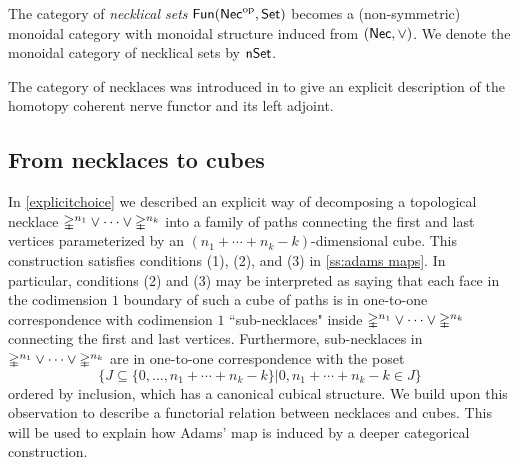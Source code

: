 The category of \textit{necklical sets} $\mathsf{Fun}(\mathsf{Nec}^{\mathrm{op}}, \mathsf{Set})$ becomes a (non-symmetric) monoidal category with monoidal structure induced from $(\mathsf{Nec}, \vee)$.
We denote the monoidal category of necklical sets by $\mathsf{nSet}$.

\begin{remark*}
	The category of necklaces was introduced in \cite{dugger2011rigidification} to give an explicit description of the homotopy coherent nerve functor and its left adjoint.
\end{remark*}

\subsection{From necklaces to cubes}

In \cref{explicitchoice} we described an explicit way of decomposing a topological necklace $\mathbb{\Delta}^{n_1} \vee \cdots \vee \mathbb{\Delta}^{n_k}$ into a family of paths connecting the first and last vertices parameterized by an $(n_1 + \cdots + n_k-k)$-dimensional cube.
This construction satisfies conditions (1), (2), and (3) in \cref{ss:adams maps}.
In particular, conditions (2) and (3) may be interpreted as saying that each face in the codimension $1$ boundary of such a cube of paths is in one-to-one correspondence with codimension $1$ ``sub-necklaces" inside $\mathbb{\Delta}^{n_1} \vee \cdots \vee \mathbb{\Delta}^{n_k}$ connecting the first and last vertices.
Furthermore, sub-necklaces in $\mathbb{\Delta}^{n_1} \vee \cdots \vee \mathbb{\Delta}^{n_k}$ are in one-to-one correspondence with the poset \[\{ J \subseteq \{0,\ldots, n_1+ \cdots + n_k-k\} | 0,n_1+ \cdots +n_k-k \in J \}\]
ordered by inclusion, which has a canonical cubical structure.
We build upon this observation to describe a functorial relation between necklaces and cubes.
This will be used to explain how Adams' map is induced by a deeper categorical construction.

